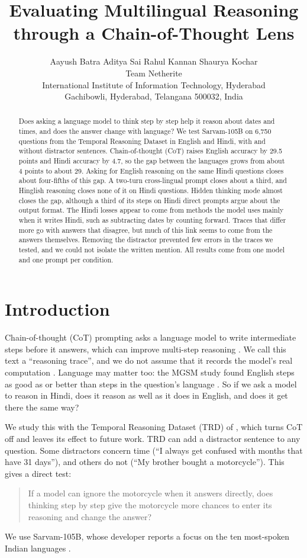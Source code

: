 \documentclass[11pt]{article}
\title{Evaluating Multilingual Reasoning through a Chain-of-Thought Lens}
\author{
  Aayush Batra \quad Aditya Sai \quad Rahul Kannan \quad Shaurya Kochar \\[0.4em]
  Team Netherite \\
  International Institute of Information Technology, Hyderabad \\
  Gachibowli, Hyderabad, Telangana 500032, India
}
\begin{document}
\maketitle

\begin{abstract}
Does asking a language model to think step by step help it reason about dates and times, and does the answer change with language? We test Sarvam-105B on 6,750 questions from the Temporal Reasoning Dataset in English and Hindi, with and without distractor sentences. Chain-of-thought (CoT) raises English accuracy by 29.5 points and Hindi accuracy by 4.7, so the gap between the languages grows from about 4 points to about 29. Asking for English reasoning on the same Hindi questions closes about four-fifths of this gap. A two-turn cross-lingual prompt closes about a third, and Hinglish reasoning closes none of it on Hindi questions. Hidden thinking mode almost closes the gap, although a third of its steps on Hindi direct prompts argue about the output format. The Hindi losses appear to come from methods the model uses mainly when it writes Hindi, such as subtracting dates by counting forward. Traces that differ more go with answers that disagree, but much of this link seems to come from the answers themselves. Removing the distractor prevented few errors in the traces we tested, and we could not isolate the written mention. All results come from one model and one prompt per condition.
\end{abstract}

\section{Introduction}
\label{sec:intro}

Chain-of-thought (CoT) prompting asks a language model to write intermediate steps before it answers, which can improve multi-step reasoning \citep{wei-etal-2022-chain,kojima2022large}. We call this text a ``reasoning trace'', and we do not assume that it records the model's real computation \citep{turpin-etal-2023-unfaithful}. Language may matter too: the MGSM study found English steps as good as or better than steps in the question's language \citep{shi-etal-2023-mgsm}. So if we ask a model to reason in Hindi, does it reason as well as it does in English, and does it get there the same way?

We study this with the Temporal Reasoning Dataset (TRD) of \citet{mazzia-etal-2026-benchmarking}, which turns CoT off and leaves its effect to future work. TRD can add a distractor sentence to any question. Some distractors concern time (``I always get confused with months that have 31 days''), and others do not (``My brother bought a motorcycle''). This gives a direct test:
\begin{quote}
If a model can ignore the motorcycle when it answers directly, does thinking step by step give the motorcycle more chances to enter its reasoning and change the answer?
\end{quote}
We use Sarvam-105B, whose developer reports a focus on the ten most-spoken Indian languages \citep{sarvam-2026-models}.
\end{document}
